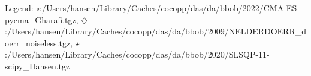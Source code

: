 Legend: {\color{CornflowerBlue}$\circ$}:/Users/hansen/Library/Caches/cocopp/das/da/bbob/2022/CMA-ES-pycma\_Gharafi.tgz, {{}$\diamondsuit$}:/Users/hansen/Library/Caches/cocopp/das/da/bbob/2009/NELDERDOERR\_doerr\_noiseless.tgz, {\color{Green}$\star$}:/Users/hansen/Library/Caches/cocopp/das/da/bbob/2020/SLSQP-11-scipy\_Hansen.tgz